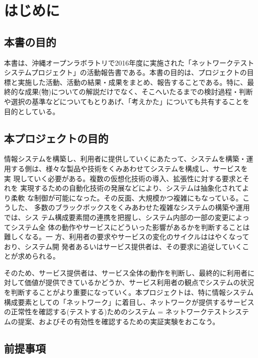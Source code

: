 
\chapter{はじめに}
\label{chap:abstract}

 \section{本書の目的}
 \label{sec:book-purpose}

本書は、沖縄オープンラボラトリで2016年度に実施された「ネットワークテスト
システムプロジェクト」の活動報告書である。本書の目的は、プロジェクトの目
標と実施した活動、活動の結果・成果をまとめ、報告することである。特に、最
終的な成果(物)についての解説だけでなく、そこへいたるまでの検討過程・判断
や選択の基準などについてもとりあげ、「考えかた」についても共有することを
目的としている。

 \section{本プロジェクトの目的}
 \label{sec:pj-purpose}


情報システムを構築し、利用者に提供していくにあたって、システムを構築・運
用する側は、様々な製品や技術をくみあわせてシステムを構成し、サービスを実
現していく必要がある。複数の仮想化技術の導入、拡張性に対する要求とそれを
実現するための自動化技術の発展などにより、システムは抽象化されてより柔軟
な制御が可能になった。その反面、大規模かつ複雑にもなっている。こうした、
多数のブラックボックスをくみあわせた複雑なシステムの構築や運用では、シス
テム構成要素間の連携を把握し、システム内部の一部の変更によってシステム全
体の動作やサービスにどういった影響があるかを判断することは難しくなる。一
方、利用者の要求やサービスの変化のサイクルははやくなっており、システム開
発者あるいはサービス提供者は、その要求に追従していくことが求められる。

そのため、サービス提供者は、サービス全体の動作を判断し、最終的に利用者に
対して価値が提供できているかどうか、サービス利用者の観点でシステムの状況
を判断することがより重要になっていく。本プロジェクトは、特に情報システム
構成要素としての「ネットワーク」に着目し、ネットワークが提供するサービス
の正常性を確認する(テストする)ためのシステム = ネットワークテストシステ
ムの提案、およびその有効性を確認するための実証実験をおこなう。

 \section{前提事項}
 \label{sec:premise}

